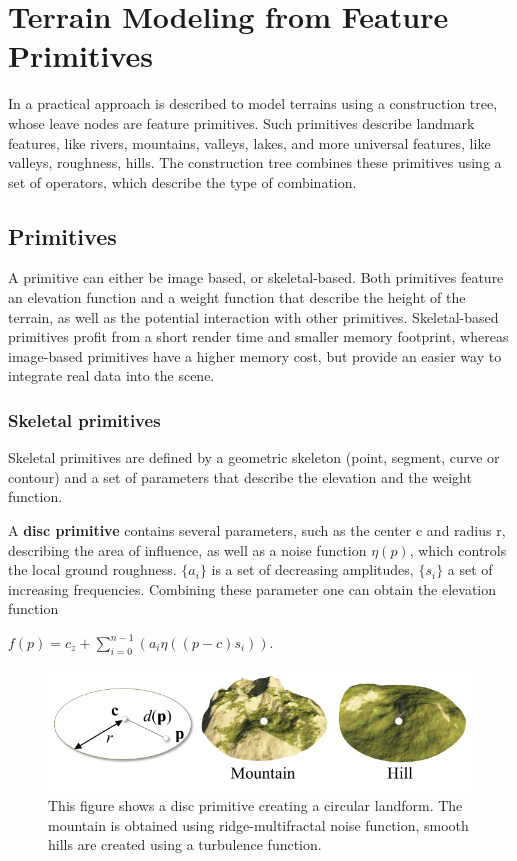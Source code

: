 \section{Terrain Modeling from Feature Primitives}
\label{sec:tmffp}
In \cite{CGF:CGF12530} a practical approach is described to model terrains using a construction tree, whose leave nodes are feature primitives. Such primitives describe landmark features, like rivers, mountains, valleys, lakes, and more universal features, like valleys, roughness, hills. The construction tree combines these primitives using a set of operators, which describe the type of combination. 

\subsection{Primitives}
A primitive can either be image based, or skeletal-based. Both primitives feature an elevation function and a weight function that describe the height of the terrain, as well as the potential interaction with other primitives. Skeletal-based primitives profit from a short render time and smaller memory footprint, whereas image-based primitives have a higher memory cost, but provide an easier way to integrate real data into the scene. 

\subsubsection{Skeletal primitives}
Skeletal primitives are defined by a geometric skeleton (point, segment, curve or contour) and a set of parameters that describe the elevation and the weight function. 

A \textbf{disc primitive} contains several parameters, such as the center c and radius r, describing the area of influence, as well as a noise function $\eta(p) $, which controls the local ground roughness. $\{a_i\}$ is a set of decreasing amplitudes, $\{s_i\}$ a set of increasing frequencies. Combining these parameter one can obtain the elevation function
\begin{center}
$ f(p) = c_{z} +  \sum\limits_{i = 0}^{n-1}(a_i\eta((p-c)s_i))$. 
\end{center}

\begin{figure}[htb]
	\centering
	\includegraphics[width=.8\linewidth]{GGP15/disc_primitive}
	\caption{This figure shows a disc primitive creating a circular landform. The mountain is obtained using ridge-multifractal noise function, smooth hills are created using a turbulence function.}
	\label{fig:disc_primitive}
\end{figure}

